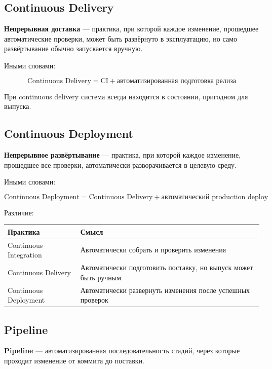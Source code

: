 \documentclass[12pt,a4paper]{article}
\begin{document}
\subsection{Continuous Delivery}

\textbf{Непрерывная доставка} --- практика, при которой каждое изменение, прошедшее автоматические проверки, может быть развёрнуто в эксплуатацию, но само развёртывание обычно запускается вручную.

Иными словами:

\[
\text{Continuous Delivery} = \text{CI} + \text{автоматизированная подготовка релиза}
\]

При continuous delivery система всегда находится в состоянии, пригодном для выпуска.

\subsection{Continuous Deployment}

\textbf{Непрерывное развёртывание} --- практика, при которой каждое изменение, прошедшее все проверки, автоматически разворачивается в целевую среду.

Иными словами:

\[
\text{Continuous Deployment} = \text{Continuous Delivery} + \text{автоматический production deploy}
\]

Различие:

\begin{center}
\begin{tabular}{|p{5cm}|p{8cm}|}
\hline
\textbf{Практика} & \textbf{Смысл} \\
\hline
Continuous Integration & Автоматически собрать и проверить изменения \\
\hline
Continuous Delivery & Автоматически подготовить поставку, но выпуск может быть ручным \\
\hline
Continuous Deployment & Автоматически развернуть изменения после успешных проверок \\
\hline
\end{tabular}
\end{center}

\subsection{Pipeline}

\textbf{Pipeline} --- автоматизированная последовательность стадий, через которые проходит изменение от коммита до поставки.
\end{document}
